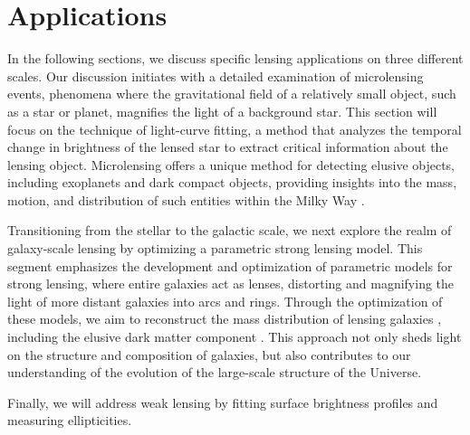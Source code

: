 \chapter{Applications}
\label{chap:applications}

In the following sections, we discuss specific lensing applications on three different scales.
Our discussion initiates with a detailed examination of microlensing events, phenomena where the gravitational field of a relatively small object, such as a star or planet, magnifies the light of a background star. This section will focus on the technique of light-curve fitting, a method that analyzes the temporal change in brightness of the lensed star to extract critical information about the lensing object. Microlensing offers a unique method for detecting elusive objects, including exoplanets \citep{sumi_unbound_2011,gaudi_microlensing_2012} and dark compact objects, providing insights into the mass, motion, and distribution of such entities within the Milky Way \citep{alcock_possible_1993,udalski_optical_1993}.

Transitioning from the stellar to the galactic scale, we next explore the realm of galaxy-scale lensing \citep{treu_strong_2010} by optimizing a parametric strong lensing model. This segment emphasizes the development and optimization of parametric models for strong lensing, where entire galaxies act as lenses, distorting and magnifying the light of more distant galaxies into arcs and rings. Through the optimization of these models, we aim to reconstruct the mass distribution of lensing galaxies \citep{auger_sloan_2010}, including the elusive dark matter component \citep{vegetti_detection_2010}. This approach not only sheds light on the structure and composition of galaxies, but also contributes to our understanding of the evolution of the large-scale structure of the Universe.

Finally, we will address weak lensing by fitting surface brightness profiles and measuring ellipticities.






